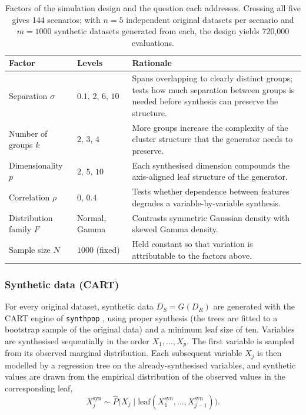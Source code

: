 \documentclass[pdflatex,sn-basic]{sn-jnl}
\begin{document}
\begin{table}[t]
\centering
\caption{Factors of the simulation design and the question each addresses.
         Crossing all five gives 144 scenarios; with $n=5$ independent original
         datasets per scenario and $m=1000$ synthetic datasets generated from
         each, the design yields 720{,}000 evaluations.}
\label{tab:design}
\small
\begin{tabular}{llp{6.4cm}}
\toprule
Factor & Levels & Rationale \\
\midrule
Separation $\sigma$      & $0.1,\,2,\,6,\,10$ & Spans overlapping to clearly
  distinct groups; tests how much separation between groups is needed before
  synthesis can preserve the structure. \\
Number of groups $k$     & $2,\,3,\,4$        & More groups increase the
  complexity of the cluster structure that the generator needs to
  preserve. \\
Dimensionality $p$       & $2,\,5,\,10$       & Each synthesised dimension
  compounds the axis-aligned leaf structure of the generator. \\
Correlation $\rho$       & $0,\,0.4$          & Tests whether dependence
  between features degrades a variable-by-variable synthesis. \\
Distribution family $F$  & Normal, Gamma      & Contrasts symmetric Gaussian
  density with skewed Gamma density. \\
\midrule
Sample size $N$          & $1000$ (fixed)     & Held constant so that
  variation is attributable to the factors above. \\
\bottomrule
\end{tabular}
\end{table}

\subsubsection{Synthetic data (CART)}
\label{sec:cart}

For every original dataset, synthetic data $D_S = G(D_R)$ are generated with
the CART engine of \texttt{synthpop} \citep{nowok2016}, using proper synthesis
(the trees are fitted to a bootstrap sample of the original data) and a minimum
leaf size of ten. Variables are synthesised sequentially in the order
$X_1,\dots,X_p$. The first variable is sampled from its observed marginal
distribution. Each subsequent variable $X_j$ is then modelled by a regression
tree \citep{breiman1984} on the already-synthesised variables, and synthetic
values are drawn from the empirical distribution of the observed values in the
corresponding leaf,
\begin{equation}
  X_j^{\text{syn}} \sim
    \widehat{P}\bigl(X_j \mid
      \text{leaf}(X_1^{\text{syn}},\dots,X_{j-1}^{\text{syn}})\bigr).
  \label{eq:cart}
\end{equation}
\end{document}
